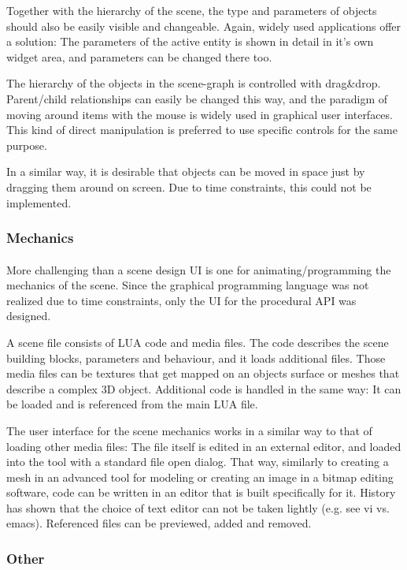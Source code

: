 Together with the hierarchy of the scene, the type and parameters of objects should also be easily visible and changeable.
Again, widely used applications offer a solution: The parameters of the active entity is shown in detail in it's own widget area, and parameters can be changed there too.

The hierarchy of the objects in the scene-graph is controlled with drag\&drop.
Parent/child relationships can easily be changed this way, and the paradigm of moving around items with the mouse is widely used in graphical user interfaces.
This kind of direct manipulation is preferred to use specific controls for the same purpose.

In a similar way, it is desirable that objects can be moved in space just by dragging them around on screen.
Due to time constraints, this could not be implemented.

\subsubsection{Mechanics}
\paragraph{}
More challenging than a scene design UI is one for animating/programming the mechanics of the scene.
Since the graphical programming language was not realized due to time constraints, only the UI for the procedural API was designed.

A scene file consists of LUA code and media files.
The code describes the scene building blocks, parameters and behaviour, and it loads additional files.
Those media files can be textures that get mapped on an objects surface or meshes that describe a complex 3D object.
Additional code is handled in the same way: It can be loaded and is referenced from the main LUA file.

The user interface for the scene mechanics works in a similar way to that of loading other media files:
The file itself is edited in an external editor, and loaded into the tool with a standard file open dialog.
That way, similarly to creating a mesh in an advanced tool for modeling or creating an image in a bitmap editing software, code can be written in an editor that is built specifically for it.
History has shown that the choice of text editor can not be taken lightly (e.g. see vi vs. emacs).
Referenced files can be previewed, added and removed.

\subsubsection{Other}
